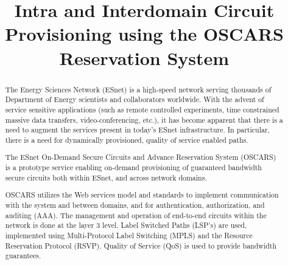 \documentclass[conference]{IEEEtran}
\begin{document}
\title{Intra and Interdomain Circuit Provisioning using the OSCARS Reservation System}

% 
\author{
}

\maketitle

\begin{abstract}
The Energy Sciences Network (ESnet) is a high-speed network serving thousands 
of Department of Energy scientists and collaborators worldwide.
With the advent of service sensitive applications (such as remote controlled 
experiments, time constrained massive data transfers, video-conferencing, etc.),
it has become apparent that there is a need to augment the services present in
today's ESnet infrastructure.  In particular, there is a need for dynamically 
provisioned, quality of service enabled paths.

The ESnet On-Demand Secure Circuits and Advance Reservation System (OSCARS) is 
a prototype service enabling on-demand provisioning of guaranteed bandwidth 
secure circuits both within ESnet, and across network domains.

OSCARS utilizes the Web services model and standards to implement communication
with the system and between domains, and for authentication, authorization,
and auditing (AAA).  The management and operation of end-to-end circuits 
within the network is done at the layer 3 level.  Label Switched Paths 
(LSP's) are used, implemented using Multi-Protocol Label Switching (MPLS) and 
the Resource Reservation Protocol (RSVP). Quality of Service (QoS) is used to 
provide bandwidth guarantees.
\end{abstract}


%
\IEEEpeerreviewmaketitle
\end{document}
